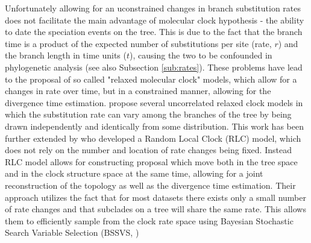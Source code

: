 Unfortunately allowing for an uconstrained changes in branch substitution rates does not facilitate the main advantage of molecular clock hypothesis - the ability to date the speciation events on the tree.
This is due to the fact that the branch time is a product of the expected number of substitutions per site (rate, $r$) and the branch length in time units ($t$), causing the two to be confounded in phylogenetic analysis (see also Subsection \ref{sub:rates}).
These problems have lead to the proposal of so called "relaxed molecular clock" models, which allow for a changes in rate over time, but in a constrained manner, allowing for the divergence time estimation.
\citet{Drummond2006} propose several uncorrelated relaxed clock models in which the substitution rate can vary among the branches of the tree by being drawn independently and identically from some distribution.
This work has been further extended by \citet{Drummond2010} who developed a Random Local Clock (RLC) model, which does not rely on the number and location of rate changes being fixed.
Instead RLC model allows for constructing proposal which move both in the tree space and in the clock structure space at the same time, allowing for a joint reconstruction of the topology as well as the divergence time estimation. 
Their approach utilizes the fact that for most datasets there exists only a small number of rate changes and that subclades on a tree will share the same rate.
This allows them to efficiently sample from the clock rate space using Bayesian Stochastic Search Variable Selection (BSSVS, \citet{Lemey2009}) 

